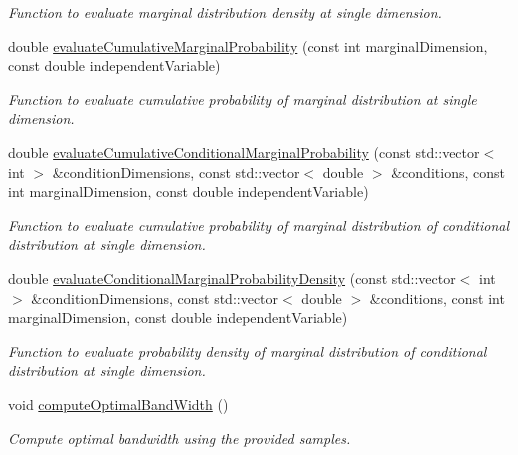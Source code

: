 \begin{DoxyCompactItemize}
\begin{DoxyCompactList}\small\item\em Function to evaluate marginal distribution density at single dimension. \end{DoxyCompactList}\item 
double \hyperlink{classtudat_1_1statistics_1_1KernelDensityDistribution_a20e89a464116be53ca29c7344c34fb06}{evaluate\+Cumulative\+Marginal\+Probability} (const int marginal\+Dimension, const double independent\+Variable)
\begin{DoxyCompactList}\small\item\em Function to evaluate cumulative probability of marginal distribution at single dimension. \end{DoxyCompactList}\item 
double \hyperlink{classtudat_1_1statistics_1_1KernelDensityDistribution_a880a77577d2ef5a77e168fa0df101cf7}{evaluate\+Cumulative\+Conditional\+Marginal\+Probability} (const std\+::vector$<$ int $>$ \&condition\+Dimensions, const std\+::vector$<$ double $>$ \&conditions, const int marginal\+Dimension, const double independent\+Variable)
\begin{DoxyCompactList}\small\item\em Function to evaluate cumulative probability of marginal distribution of conditional distribution at single dimension. \end{DoxyCompactList}\item 
double \hyperlink{classtudat_1_1statistics_1_1KernelDensityDistribution_a05756e1d03cdeeaf55e6e6677d844841}{evaluate\+Conditional\+Marginal\+Probability\+Density} (const std\+::vector$<$ int $>$ \&condition\+Dimensions, const std\+::vector$<$ double $>$ \&conditions, const int marginal\+Dimension, const double independent\+Variable)
\begin{DoxyCompactList}\small\item\em Function to evaluate probability density of marginal distribution of conditional distribution at single dimension. \end{DoxyCompactList}\item 
void \hyperlink{classtudat_1_1statistics_1_1KernelDensityDistribution_ab2049005a0f3decd363646f2832b5c89}{compute\+Optimal\+Band\+Width} ()
\begin{DoxyCompactList}\small\item\em Compute optimal bandwidth using the provided samples. \end{DoxyCompactList}\item 

\end{DoxyCompactItemize}
